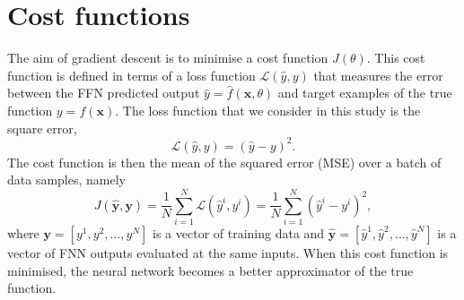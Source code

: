 \section{Cost functions}
The aim of gradient descent is to minimise a cost function $J(\theta)$. 
This cost function is defined in terms of a loss function $\mathcal{L}(\hat{y}, y)$ that measures the error between the FFN predicted output $\hat{y} = \hat{f}(\bm{x}, \theta)$ and target examples of the true function $y = f(\bm{x})$. 
The loss function that we consider in this study is the square error,
\begin{equation}\label{eq:nn_loss}
    \mathcal{L}(\hat{y},y)=(\hat{y}-y)^2.
\end{equation}
The cost function is then the mean of the squared error (MSE) over a batch of data samples, namely
\begin{equation}
    J(\mathbf{\hat{y}, y}) = \frac{1}{N} \sum_{i=1}^{N} \mathcal{L}(\hat{y}^i, y^i) = \frac{1}{N} \sum_{i=1}^{N} (\hat{y}^i - y^i)^2,
    \label{eq:cost_function}
\end{equation}
where $\mathbf{y} = [ y^1, y^2, \ldots , y^N ]$ is a vector of training data and $\mathbf{\hat{y}} = [ \hat{y}^1, \hat{y}^2, \ldots , \hat{y}^N ]$ is a vector of FNN outputs evaluated at the same inputs.
When this cost function is minimised, the neural network becomes a better approximator of the true function.


